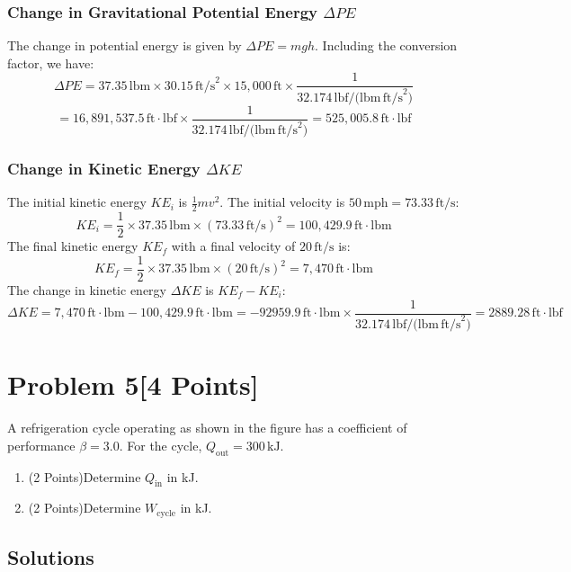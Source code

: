 \documentclass{article}
\begin{document}
\subsubsection*{Change in Gravitational Potential Energy \(\Delta PE\)}
The change in potential energy is given by \(\Delta PE = mgh\). Including the conversion factor, we have:
\[
\Delta PE = 37.35 \, \text{lbm} \times 30.15 \, \text{ft/s}^2 \times 15,000 \, \text{ft} \times \frac{1}{32.174 \, \text{lbf/(lbm} \, \text{ft/s}^2)} 
\]
\[
= 16,891,537.5 \, \text{ft} \cdot \text{lbf} \times \frac{1}{32.174 \, \text{lbf/(lbm} \, \text{ft/s}^2)} = 525,005.8 \, \text{ft} \cdot \text{lbf}
\]


\subsubsection*{Change in Kinetic Energy \(\Delta KE\)}
The initial kinetic energy \(KE_i\) is \(\frac{1}{2} mv^2\). The initial velocity is \(50 \, \text{mph} = 73.33 \, \text{ft/s}\):
\[
KE_i = \frac{1}{2} \times 37.35 \, \text{lbm} \times (73.33 \, \text{ft/s})^2 = 100,429.9 \, \text{ft} \cdot \text{lbm}
\]
The final kinetic energy \(KE_f\) with a final velocity of \(20 \, \text{ft/s}\) is:
\[
KE_f = \frac{1}{2} \times 37.35 \, \text{lbm} \times (20 \, \text{ft/s})^2 = 7,470 \, \text{ft} \cdot \text{lbm}
\]
The change in kinetic energy \(\Delta KE\) is \(KE_f - KE_i\):
\[
\Delta KE = 7,470 \, \text{ft} \cdot \text{lbm} - 100,429.9 \, \text{ft} \cdot \text{lbm} = -92959.9 \, \text{ft} \cdot \text{lbm}  \times \frac{1}{32.174 \, \text{lbf/(lbm} \, \text{ft/s}^2)} = 2889.28 \, \text{ft} \cdot \text{lbf}
\]



\newpage
\section*{Problem 5[4 Points]}
A refrigeration cycle operating as shown in the figure has a coefficient of performance \( \beta = 3.0 \). For the cycle, \( Q_{\text{out}} = 300 \, \text{kJ} \).

\begin{enumerate}
    \item (2 Points)Determine \( Q_{\text{in}} \) in kJ.
    \item (2 Points)Determine \( W_{\text{cycle}} \) in kJ.
\end{enumerate}

\subsection*{Solutions}
\end{document}
